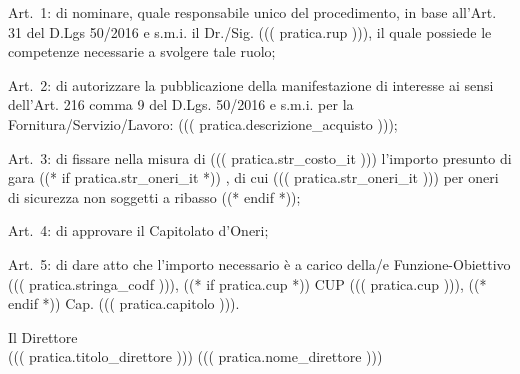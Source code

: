 \documentclass[a4paper,12pt]{letter}
\begin{document}
\begin{list}{VALUTATA}{}
\item[Art.~1:] di nominare, quale responsabile unico del procedimento, in base 
           all'Art. 31 del D.Lgs 50/2016 e s.m.i. il Dr./Sig. ((( pratica.rup ))),
           il quale possiede le competenze necessarie a svolgere tale ruolo; 

\item[Art.~2:] di autorizzare la pubblicazione della manifestazione di interesse
	ai sensi dell’Art. 216 comma 9 del D.Lgs. 50/2016 e s.m.i.
        per la Fornitura/Servizio/Lavoro: ((( pratica.descrizione_acquisto )));

\item[Art.~3:] di fissare nella misura di ((( pratica.str_costo_it ))) l'importo presunto di gara%
((* if pratica.str_oneri_it *))%
, di cui ((( pratica.str_oneri_it ))) per oneri di sicurezza non soggetti a ribasso%
((* endif *));

\item[Art.~4:] di approvare il Capitolato d'Oneri;
\end{list}
\begin{minipage}{\linewidth}
\begin{list}{VALUTATA}{}
\item[Art.~5:] di dare atto che l'importo necessario è a carico della/e Funzione-Obiettivo ((( pratica.stringa_codf ))), ((* if pratica.cup *)) CUP ((( pratica.cup ))), ((* endif *)) Cap. ((( pratica.capitolo ))).
\end{list}
\vspace{10mm}

\begin{flushright}
\begin{minipage}[t]{6cm}
\begin{center}
Il Direttore \\
((( pratica.titolo_direttore ))) ((( pratica.nome_direttore )))
\end{center}
\end{minipage}
\end{flushright}
\end{minipage}
\end{document}
